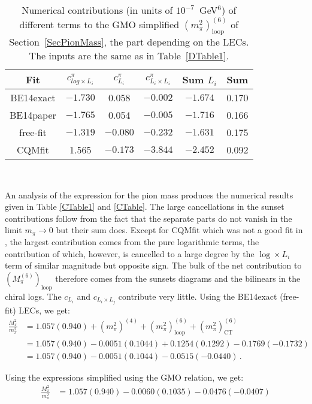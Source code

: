 \documentclass[12pt,a4paper]{article}
\begin{document}
\begin{table}
\centering
\begin{tabular}{| c || c c c | c | c |}
\hline
Fit & $c^{\pi}_{log \times L_i}$ & $c^\pi_{L_i}$ & $ c^\pi_{L_i\times L_i}$ & Sum $L_i$ & Sum \\ 
\hline
\hline
BE14exact & $-1.730$ & 0.058 & $-0.002$ & $-1.674$ & 0.170 \\
BE14paper & $-1.765$ & 0.054 & $-0.005$ & $-1.716$ & 0.166 \\
free-fit  & $-1.319$ & $-0.080$ & $-0.232$ & $-1.631$ & 0.175 \\
CQMfit    & 1.565 & $-0.173$ & $-3.844$& $-2.452$ & 0.092 \\ [1ex]
\hline
\end{tabular} \\
\caption{Numerical contributions (in units of $10^{-7}$~GeV$^{6}$) of different terms to the GMO simplified $\left( {m}_{\pi}^2 \right)^{(6)}_{\text{loop}}$ of Section~\ref{SecPionMass}, the part depending on the LECs. The inputs are the same as in Table~\ref{DTable1}.}
\label{CTable2}
\end{table}


An analysis of the expression for the pion mass produces the numerical results given in Table \ref{CTable1} and \ref{CTable}. 
The large cancellations in the sunset contributions follow from the fact that the separate parts do not vanish in the limit $m_\pi\to 0$ but their sum does. Except for CQMfit which was not a good fit in \cite{Bijnens:2014lea}, the largest contribution comes from the pure logarithmic terms, the contribution of which, however, is cancelled to a large degree by the $\log \times L_i$ term of similar magnitude but opposite sign. The bulk of the net contribution to $(M^{(6)}_{\pi})_{\text{loop}}$ therefore comes from the sunsets diagrams and the bilinears in the chiral logs. The $c_{L_i}$ and $c_{L_i \times L_j}$ contribute very little. Using the BE14exact (free-fit) LECs, we get:
\begin{align}
	\frac{M_{\pi}^2}{m_{\pi}^2} & = 1.057(0.940) + (m_{\pi}^2)^{(4)} + (m_{\pi}^2)^{(6)}_{\text{loop}} + (m_{\pi}^2)^{(6)}_{\text{CT}} \nonumber \\
	& =	1.057(0.940) - 0.0051(0.1044) + 0.1254(0.1292) - 0.1769(-0.1732)  \nonumber \\
	& = 1.057(0.940) - 0.0051(0.1044) - 0.0515(-0.0440) \,.
\end{align}

Using the expressions simplified using the GMO relation, we get:
\begin{align}
	\frac{M_{\pi}^2}{m_{\pi}^2} & = 1.057(0.940) -0.0060(0.1035) -0.0476(-0.0407)
\end{align}
\end{document}
